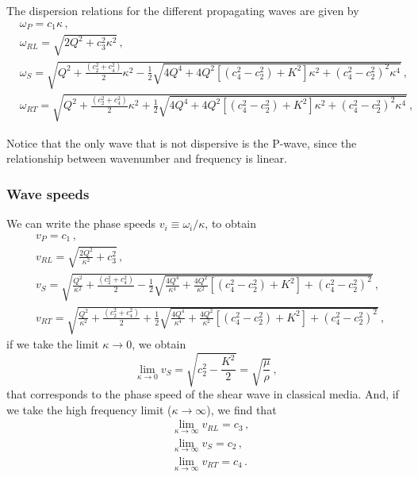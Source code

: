 \documentclass[12pt]{article}
\begin{document}
The dispersion relations for the different propagating waves are given by
\begin{align}
&\omega_P = c_1 \kappa\, ,\\
&\omega_{RL} = \sqrt{2Q^2 + c_3^2 \kappa^2}\, ,\\
&\omega_S = \sqrt{Q^{2} + \frac{(c_2^2 + c_4^2)}{2}\kappa^2 - \frac{1}{2} \sqrt{4Q^4 +
   4Q^2[(c_4^2 - c_2^2) + K^2]\kappa^2 + (c_4^2 - c_2^2)^2 \kappa^4}}\, ,\\
&\omega_{RT} = \sqrt{Q^{2} + \frac{(c_2^2 + c_4^2)}{2}\kappa^2 + \frac{1}{2} \sqrt{4Q^4 +
   4Q^2[(c_4^2 - c_2^2) + K^2]\kappa^2 + (c_4^2 - c_2^2)^2 \kappa^4}}\, ,
\end{align}

Notice that the only wave that is not dispersive is the P-wave, since the relationship between wavenumber and frequency is linear.

\subsubsection{Wave speeds}
We can write the phase speeds \(v_i \equiv \omega_i/\kappa\), to obtain
\begin{align}
&v_P = c_1 \, ,\\
&v_{RL} = \sqrt{\frac{2Q^2}{\kappa^2} + c_3^2}\, ,\\
&v_S = \sqrt{\frac{Q^2}{\kappa^2} + \frac{(c_2^2 + c_4^2)}{2} - \frac{1}{2} \sqrt{\frac{4Q^4}{\kappa^4} + \frac{4Q^2}{\kappa^2}[(c_4^2 - c_2^2) + K^2] + (c_4^2 - c_2^2)^2}}\, ,\\
&v_{RT} = \sqrt{\frac{Q^2}{\kappa^2} + \frac{(c_2^2 + c_4^2)}{2} + \frac{1}{2} \sqrt{\frac{4Q^4}{\kappa^4} + \frac{4Q^2}{\kappa^2}[(c_4^2 - c_2^2) + K^2] + (c_4^2 - c_2^2)^2}}\, ,
\end{align}
if we take the limit \(\kappa \rightarrow 0\), we obtain
\[\lim_{\kappa \rightarrow 0} v_S = \sqrt{c_2^2 - \frac{K^2}{2}}=\sqrt{\frac{\mu}{\rho}}\, ,\]
that corresponds to the phase speed of the shear wave in classical media. And, if we take the high frequency limit (\(\kappa \rightarrow \infty\)), we find that
\begin{align*}
&\lim_{\kappa \rightarrow \infty}v_{RL} = c_3\, ,\\
&\lim_{\kappa \rightarrow \infty}v_S = c_2\, ,\\
&\lim_{\kappa \rightarrow \infty}v_{RT} = c_4\, .
\end{align*}
\end{document}
